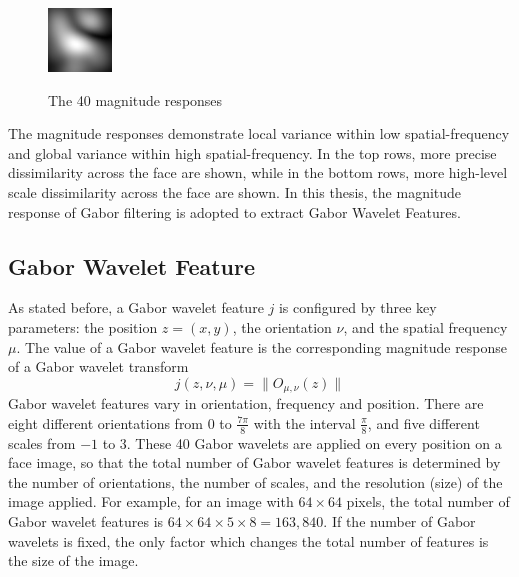 \begin{figure}[ht]
\begin{center}
 \includegraphics[width=\columnwidth/9]{ch4/figures/mag_3_7.jpg}\\
 \caption{The 40 magnitude responses}
\label{fig:magresponses}
\end{center}
\end{figure} 
The magnitude responses demonstrate local variance within low spatial-frequency and global variance within high spatial-frequency. In the top rows, more precise dissimilarity across the face are shown, while in the bottom rows, more high-level scale dissimilarity across the face are shown. In this thesis, the magnitude response of Gabor filtering is adopted to extract Gabor Wavelet Features. 


\subsection{Gabor Wavelet Feature}
\label{sec:gaborwaveletfeature}
As stated before, a Gabor wavelet feature $j$ is configured by three key parameters: the position $z = (x,y)$, the orientation $\nu$, and the spatial frequency $\mu$. The value of a Gabor wavelet feature is the corresponding magnitude response of a Gabor wavelet transform
\begin{equation}\label{eq:gaborfeature}
 j(z,\nu,\mu) =  \|O_{\mu,\nu}(z)\|
\end{equation}
Gabor wavelet features vary in orientation, frequency and position. There are eight different orientations from $0$ to $\frac{7\pi}{8}$ with the interval $\frac{\pi}{8}$, and five different scales from $-1$ to $3$.  These 40 Gabor wavelets are applied on every position on a face image, so that the total number of Gabor wavelet features is determined by the number of orientations, the number of scales, and the resolution (size) of the image  applied. For example, for an image with $64\times 64$ pixels, the total number of Gabor wavelet features is $64\times 64\times 5\times 8=163,840$. If the number of Gabor wavelets is fixed, the only factor which changes the total number of features is the size of the image.


